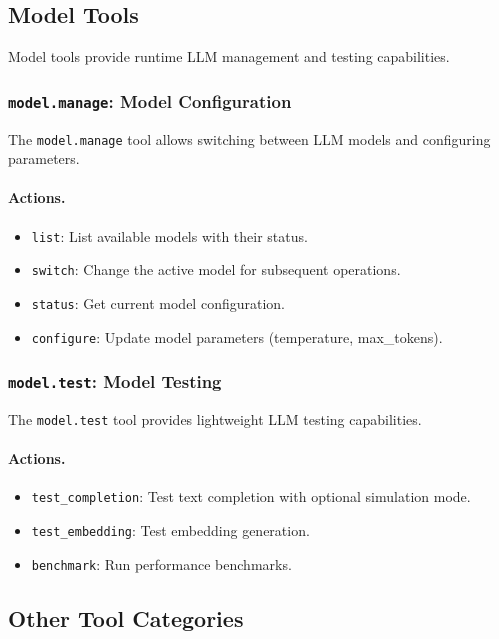 \subsection{Model Tools}
\label{subsec:model-tools}

Model tools provide runtime LLM management and testing capabilities.

\subsubsection{\texttt{model.manage}: Model Configuration}

The \texttt{model.manage} tool allows switching between LLM models and configuring parameters.

\paragraph{Actions.}
\begin{itemize}
    \item \texttt{list}: List available models with their status.
    \item \texttt{switch}: Change the active model for subsequent operations.
    \item \texttt{status}: Get current model configuration.
    \item \texttt{configure}: Update model parameters (temperature, max\_tokens).
\end{itemize}

\subsubsection{\texttt{model.test}: Model Testing}

The \texttt{model.test} tool provides lightweight LLM testing capabilities.

\paragraph{Actions.}
\begin{itemize}
    \item \texttt{test\_completion}: Test text completion with optional simulation mode.
    \item \texttt{test\_embedding}: Test embedding generation.
    \item \texttt{benchmark}: Run performance benchmarks.
\end{itemize}

\subsection{Other Tool Categories}
\label{subsec:other-tools}

